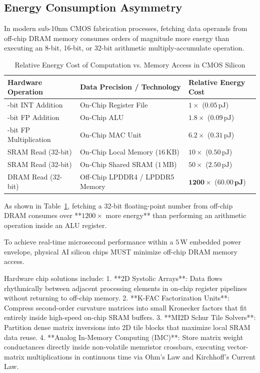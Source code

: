 \subsection{Energy Consumption Asymmetry}
In modern sub-10nm CMOS fabrication processes, fetching data operands from off-chip DRAM memory consumes orders of magnitude more energy than executing an 8-bit, 16-bit, or 32-bit arithmetic multiply-accumulate operation.

\begin{table}[htbp]
\centering
\caption{Relative Energy Cost of Computation vs. Memory Access in CMOS Silicon}
\label{tab:ch01_energy_cost}
\begin{tabularx}{\textwidth}{>{\raggedright\arraybackslash}p{4.2cm} >{\raggedright\arraybackslash}X >{\raggedright\arraybackslash}p{3.2cm}}
\toprule
\textbf{Hardware Operation} & \textbf{Data Precision / Technology} & \textbf{Relative Energy Cost} \\
\midrule
32-bit INT Addition & On-Chip Register File & $1\times$ ($0.05\,\text{pJ}$) \\
32-bit FP Addition & On-Chip ALU & $1.8\times$ ($0.09\,\text{pJ}$) \\
32-bit FP Multiplication & On-Chip MAC Unit & $6.2\times$ ($0.31\,\text{pJ}$) \\
SRAM Read (32-bit) & On-Chip Local Memory ($16\,\text{KB}$) & $10\times$ ($0.50\,\text{pJ}$) \\
SRAM Read (32-bit) & On-Chip Shared SRAM ($1\,\text{MB}$) & $50\times$ ($2.50\,\text{pJ}$) \\
DRAM Read (32-bit) & Off-Chip LPDDR4 / LPDDR5 Memory & $\mathbf{1200\times}$ ($\mathbf{60.00\,\text{pJ}}$) \\
\bottomrule
\end{tabularx}
\end{table}

As shown in Table~\ref{tab:ch01_energy_cost}, fetching a 32-bit floating-point number from off-chip DRAM consumes over **$1200\times$ more energy** than performing an arithmetic operation inside an ALU register.

\begin{hardwarebox}
To achieve real-time microsecond performance within a $5\,\text{W}$ embedded power envelope, physical AI silicon chips MUST minimize off-chip DRAM memory access.

Hardware chip solutions include:
1. **2D Systolic Arrays**: Data flows rhythmically between adjacent processing elements in on-chip register pipelines without returning to off-chip memory.
2. **K-FAC Factorization Units**: Compress second-order curvature matrices into small Kronecker factors that fit entirely inside high-speed on-chip SRAM buffers.
3. **MI2D Schur Tile Solvers**: Partition dense matrix inversions into 2D tile blocks that maximize local SRAM data reuse.
4. **Analog In-Memory Computing (IMC)**: Store matrix weight conductances directly inside non-volatile memristor crossbars, executing vector-matrix multiplications in continuous time via Ohm's Law and Kirchhoff's Current Law.
\end{hardwarebox}
